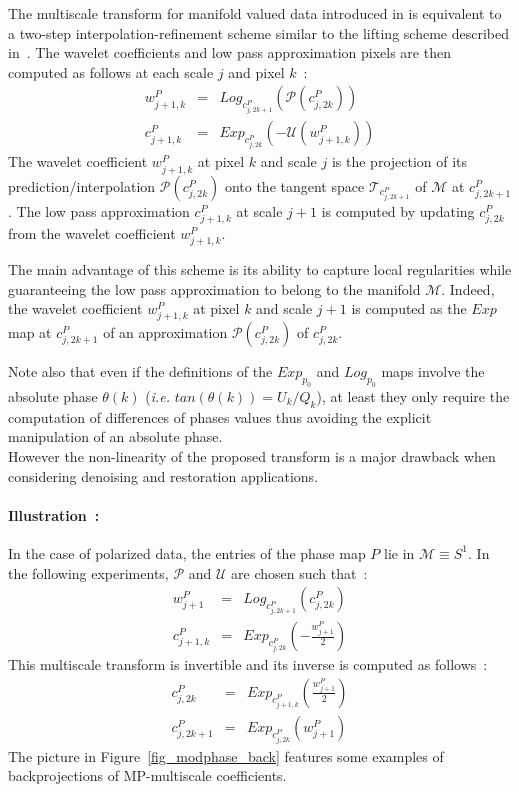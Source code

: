 The multiscale transform for manifold valued data introduced in \citep{rahman05} is equivalent to a two-step interpolation-refinement 
scheme similar to the lifting scheme described in~\citep{wave:sweldens98}. The wavelet coefficients and low pass approximation pixels 
are then computed as follows at each scale $j$ and pixel $k$~:
\begin{eqnarray}\label{eq:mani}
w_{j+1,k}^P & = & Log_{c_{j,2k+1}^P}\left(\mathcal{P}(c_{j,2k}^P)\right)   \\
c_{j+1,k}^P & = & Exp_{c_{j,2k}^P} ( -\mathcal{U}(w_{j+1,k}^P))
\label{eq:mani2}
\end{eqnarray}
The wavelet coefficient $w_{j+1,k}^P$ at pixel $k$ and scale $j$ is the projection of its prediction/interpolation $\mathcal{P}(c_{j,2k}^P)$ 
onto the tangent space $\mathcal{T}_{c_{j,2k+1}^P}$ of $\mathcal{M}$ at $c_{j,2k+1}^P$. The low pass approximation $c_{j+1,k}^P$ at scale $j+1$ 
is computed by updating $c_{j,2k}^P$ from the wavelet coefficient $w_{j+1,k}^P$.

The main advantage of this scheme is its ability to capture local regularities while guaranteeing the low pass approximation to belong to 
the manifold $\mathcal{M}$. Indeed, the wavelet coefficient $w_{j+1,k}^P$ at pixel $k$ and scale $j+1$ is computed as the $Exp$ map at 
$c_{j,2k+1}^P$ of an approximation $\mathcal{P}(c_{j,2k}^P)$ of $c_{j,2k}^P$.

Note also that even if the definitions of the $Exp_{p_0}$ and $Log_{p_0}$ maps involve the absolute phase $\theta(k)$ (\textit{i.e.} $tan(\theta(k)) = U_k/Q_k$), 
at least they only require the computation of differences of phases values thus avoiding the explicit manipulation of an absolute phase.\\
However the non-linearity of the proposed transform is a major drawback when considering denoising and restoration applications.\\ 

\paragraph{Illustration~:\\}
In the case of polarized data, the entries of the phase map $P$ lie in $\mathcal{M} \equiv S^1$. In the following experiments, $\mathcal{P}$ and $\mathcal{U}$ are chosen such that~:
\begin{eqnarray}
w_{j+1}^P & = & Log_{c_{j,2k+1}^P}(c_{j,2k}^P)  \\
c_{j+1,k}^P & = & Exp_{c_{j,2k}^P} \left( - \frac{w_{j+1}^P}{2}\right)
\end{eqnarray}
This multiscale transform is invertible and its inverse is computed as follows~:
\begin{eqnarray}
c_{j,2k}^P & = & Exp_{c_{j+1,k}^P} \left(\frac{w_{j+1}^P}{2}\right)\\
c_{j,2k+1}^P & = & Exp_{c_{j,2k}^P}\left( w_{j+1}^P \right)   
\end{eqnarray}
The picture in Figure~\ref{fig_modphase_back} features some examples of backprojections of MP-multiscale coefficients.

